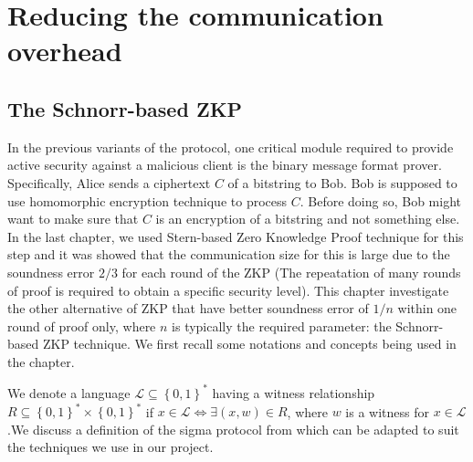 \section{Reducing the communication overhead}
\label{sec:6challenge}

\subsection{The Schnorr-based ZKP}
\label{sec:zkpschnorr}
In the previous variants of the protocol, one critical module required to
provide active security against a malicious client is the binary message format
prover. Specifically, Alice sends a ciphertext \(C\) of a bitstring to Bob. Bob
is supposed to use homomorphic encryption technique to process \(C\). Before
doing so, Bob might want to make sure that \(C\) is an encryption of a bitstring
and not something else. In the last chapter, we used Stern-based Zero Knowledge
Proof technique for this step and it was showed that the communication size for
this is large due to the soundness error $2/3$ for each round of the ZKP (The
repeatation of many rounds of proof is required to obtain a specific security
level). This chapter investigate the other alternative of ZKP that have better
soundness error of $1/n$ within one round of proof only, where $n$ is typically
the required parameter: the Schnorr-based ZKP technique. We first recall some
notations and concepts being used in the chapter.

We denote a language $\mathcal{L} \subseteq \left\{ 0,1 \right\}^* $ having a
witness relationship
$R \subseteq \left\{ 0,1 \right\}^* \times \left\{ 0,1 \right\}^*$ if
$x \in \mathcal{L} \iff \exists (x,w) \in R$, where $w$ is a witness for
$x \in \mathcal{L}$.We discuss a definition of the sigma protocol from
\cite{benhamouda2014better} which can be adapted to suit the techniques we use
in our project.

